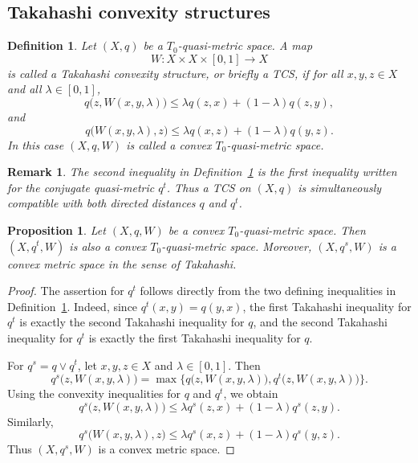 \documentclass[preprint,12pt]{elsarticle}
\numberwithin{equation}{section}
\newtheorem{proposition}[theorem]{Proposition}
\newtheorem{definition}[theorem]{Definition}
\newtheorem{remark}[theorem]{Remark}
\begin{document}
\subsection{Takahashi convexity structures}
\label{subsec:TCS}

\begin{definition}\label{def:TakahashiW}
Let \((X,q)\) be a \(T_{0}\)-quasi-metric space.  A map
\[
W:X\times X\times[0,1]\longrightarrow X
\]
is called a \emph{Takahashi convexity structure}, or briefly a \emph{TCS}, if
for all \(x,y,z\in X\) and all \(\lambda\in[0,1]\),
\[
q\bigl(z,W(x,y,\lambda)\bigr)
\le
\lambda q(z,x)+(1-\lambda)q(z,y),
\]
and
\[
q\bigl(W(x,y,\lambda),z\bigr)
\le
\lambda q(x,z)+(1-\lambda)q(y,z).
\]
In this case \((X,q,W)\) is called a \emph{convex \(T_{0}\)-quasi-metric space}.
\end{definition}

\begin{remark}\label{rem:TCS-dual}
The second inequality in Definition~\ref{def:TakahashiW} is the first
inequality written for the conjugate quasi-metric \(q^{t}\).  Thus a TCS on
\((X,q)\) is simultaneously compatible with both directed distances \(q\) and
\(q^{t}\).
\end{remark}

\begin{proposition}\label{prop:qts}
Let \((X,q,W)\) be a convex \(T_{0}\)-quasi-metric space. Then
\((X,q^{t},W)\) is also a convex \(T_{0}\)-quasi-metric space. Moreover,
\((X,q^{s},W)\) is a convex metric space in the sense of Takahashi.
\end{proposition}

\begin{proof}
The assertion for \(q^{t}\) follows directly from the two defining
inequalities in Definition~\ref{def:TakahashiW}. Indeed, since
\(q^{t}(x,y)=q(y,x)\), the first Takahashi inequality for \(q^{t}\) is exactly
the second Takahashi inequality for \(q\), and the second Takahashi inequality
for \(q^{t}\) is exactly the first Takahashi inequality for \(q\).

For \(q^{s}=q\vee q^{t}\), let \(x,y,z\in X\) and \(\lambda\in[0,1]\). Then
\[
q^{s}\bigl(z,W(x,y,\lambda)\bigr)
=
\max\bigl\{
q\bigl(z,W(x,y,\lambda)\bigr),
q^{t}\bigl(z,W(x,y,\lambda)\bigr)
\bigr\}.
\]
Using the convexity inequalities for \(q\) and \(q^{t}\), we obtain
\[
q^{s}\bigl(z,W(x,y,\lambda)\bigr)
\le
\lambda q^{s}(z,x)+(1-\lambda)q^{s}(z,y).
\]
Similarly,
\[
q^{s}\bigl(W(x,y,\lambda),z\bigr)
\le
\lambda q^{s}(x,z)+(1-\lambda)q^{s}(y,z).
\]
Thus \((X,q^{s},W)\) is a convex metric space.
\end{proof}
\end{document}
